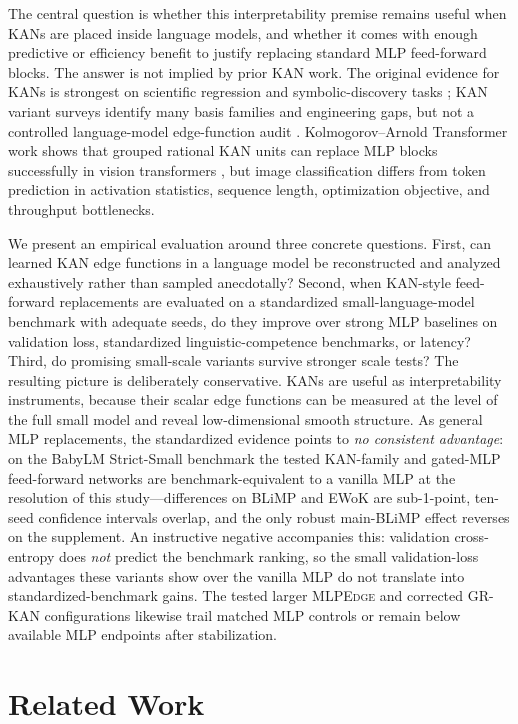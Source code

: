 \documentclass[11pt]{article}
\newcommand{\modelname}[1]{\textsc{#1}}
\newcommand{\grkan}{\modelname{GR-KAN}}
\newcommand{\mlpedge}{\modelname{MLPEdge}}
\begin{document}
The central question is whether this interpretability premise remains useful when KANs are placed inside language models, and whether it comes with enough predictive or efficiency benefit to justify replacing standard MLP feed-forward blocks. The answer is not implied by prior KAN work. The original evidence for KANs is strongest on scientific regression and symbolic-discovery tasks \cite{liu2024kan,liu2024kan2}; KAN variant surveys identify many basis families and engineering gaps, but not a controlled language-model edge-function audit \cite{somvanshi2024survey,noorizadegan2025practitioners}. Kolmogorov--Arnold Transformer work shows that grouped rational KAN units can replace MLP blocks successfully in vision transformers \cite{yang2024kat}, but image classification differs from token prediction in activation statistics, sequence length, optimization objective, and throughput bottlenecks.

We present an empirical evaluation around three concrete questions. First, can learned KAN edge functions in a language model be reconstructed and analyzed exhaustively rather than sampled anecdotally? Second, when KAN-style feed-forward replacements are evaluated on a standardized small-language-model benchmark with adequate seeds, do they improve over strong MLP baselines on validation loss, standardized linguistic-competence benchmarks, or latency? Third, do promising small-scale variants survive stronger scale tests? The resulting picture is deliberately conservative. KANs are useful as interpretability instruments, because their scalar edge functions can be measured at the level of the full small model and reveal low-dimensional smooth structure. As general MLP replacements, the standardized evidence points to \emph{no consistent advantage}: on the BabyLM Strict-Small benchmark the tested KAN-family and gated-MLP feed-forward networks are benchmark-equivalent to a vanilla MLP at the resolution of this study---differences on BLiMP and EWoK are sub-1-point, ten-seed confidence intervals overlap, and the only robust main-BLiMP effect reverses on the supplement. An instructive negative accompanies this: validation cross-entropy does \emph{not} predict the benchmark ranking, so the small validation-loss advantages these variants show over the vanilla MLP do not translate into standardized-benchmark gains. The tested larger \mlpedge{} and corrected \grkan{} configurations likewise trail matched MLP controls or remain below available MLP endpoints after stabilization.

\section{Related Work}
\end{document}
